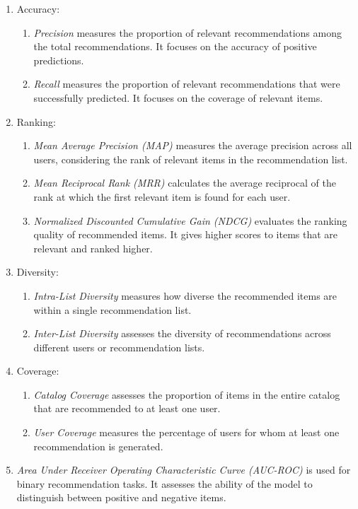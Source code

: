 			\begin{enumerate}
				\item Accuracy:
					\begin{enumerate}
						\item \textit{Precision} measures the proportion of relevant recommendations among the total recommendations. It focuses on the accuracy of positive predictions.
						\item \textit{Recall} measures the proportion of relevant recommendations that were successfully predicted. It focuses on the coverage of relevant items.
					\end{enumerate}
				\item Ranking:
					\begin{enumerate}
						\item \textit{Mean Average Precision (MAP)} measures the average precision across all users, considering the rank of relevant items in the recommendation list.
						\item \textit{Mean Reciprocal Rank (MRR)} calculates the average reciprocal of the rank at which the first relevant item is found for each user.
						\item \textit{Normalized Discounted Cumulative Gain (NDCG)} evaluates the ranking quality of recommended items. It gives higher scores to items that are relevant and ranked higher.
					\end{enumerate}
				\item Diversity:
					\begin{enumerate}
						\item \textit{Intra-List Diversity} measures how diverse the recommended items are within a single recommendation list.
						\item \textit{Inter-List Diversity} assesses the diversity of recommendations across different users or recommendation lists.
					\end{enumerate}
				\item Coverage:
					\begin{enumerate}
						\item \textit{Catalog Coverage} assesses the proportion of items in the entire catalog that are recommended to at least one user.
						\item \textit{User Coverage} measures the percentage of users for whom at least one recommendation is generated.
					\end{enumerate}
				\item \textit{Area Under Receiver Operating Characteristic Curve (AUC-ROC)} is used for binary recommendation tasks. It assesses the ability of the model to distinguish between positive and negative items.

\end{enumerate}

